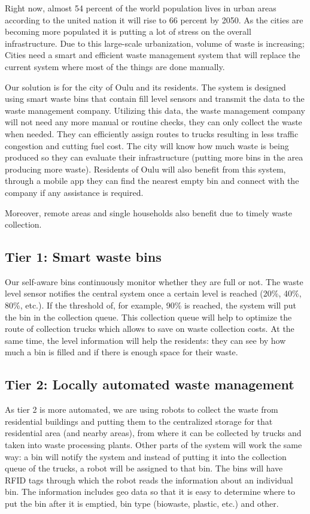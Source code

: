 \documentclass{article}
\begin{document}
Right now, almost 54 percent of the world population lives in urban areas according to the united
nation it will rise to 66 percent by 2050. As the cities are becoming more populated it is putting a
lot of stress on the overall infrastructure. Due to this large-scale urbanization, volume of waste
is increasing; Cities need a smart and efficient waste management system that will replace the
current system where most of the things are done manually.

Our solution is for the city of Oulu and its residents. The system is designed using smart waste
bins that contain fill level sensors and transmit the data to the waste management company.
Utilizing this data, the waste management company will not need any more manual or routine checks,
they can only collect the waste when needed. They can efficiently assign routes to trucks resulting
in less traffic congestion and cutting fuel cost. The city will know how much waste is being
produced so they can evaluate their infrastructure (putting more bins in the area producing more
waste). Residents of Oulu will also benefit from this system, through a mobile app they can find the
nearest empty bin and connect with the company if any assistance is required.

Moreover, remote areas and single households also benefit due to timely waste collection.

\subsection{Tier 1: Smart waste bins}

Our self-aware bins continuously monitor whether they are full or not. The waste level sensor
notifies the central system once a certain level is reached (20\%, 40\%, 80\%, etc.). If the
threshold of, for example, 90\% is reached, the system will put the bin in the collection queue.
This collection queue will help to optimize the route of collection trucks which allows to save on
waste collection costs. At the same time, the level information will help the residents: they can
see by how much a bin is filled and if there is enough space for their waste.

\subsection{Tier 2: Locally automated waste management}

As tier 2 is more automated, we are using robots to collect the waste from residential buildings and
putting them to the centralized storage for that residential area (and nearby areas), from where it
can be collected by trucks and taken into waste processing plants. Other parts of the system will
work the same way: a bin will notify the system and instead of putting it into the collection queue
of the trucks, a robot will be assigned to that bin. The bins will have RFID tags through which the
robot reads the information about an individual bin. The information includes geo data so that it is
easy to determine where to put the bin after it is emptied, bin type (biowaste, plastic, etc.) and
other.
\end{document}
